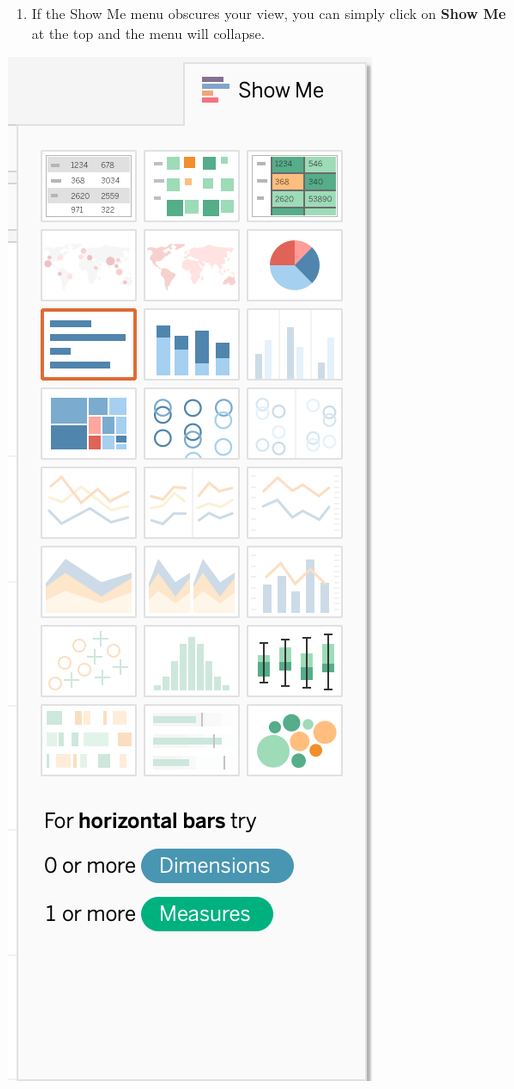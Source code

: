 \documentclass[
]{book}
\providecommand{\tightlist}{%
  \setlength{\itemsep}{0pt}\setlength{\parskip}{0pt}}
\begin{document}
\begin{enumerate}
\def\labelenumi{\arabic{enumi}.}
\setcounter{enumi}{1}
\tightlist
\item
  If the Show Me menu obscures your view, you can simply click on \textbf{Show Me} at the top and the menu will collapse.
\end{enumerate}

\includegraphics{images/M3S2_show-me-menu-zoom.png}
\end{document}
